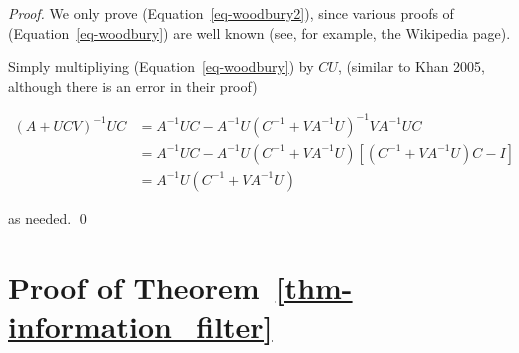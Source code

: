 \documentclass[
]{report}
\theoremstyle{plain}
\theoremstyle{plain}
\theoremstyle{remark}
\begin{document}
\begin{proof}
We only prove (Equation~\ref{eq-woodbury2}), since various proofs of
(Equation~\ref{eq-woodbury}) are well known (see, for example, the
Wikipedia page).

Simply multipliying (Equation~\ref{eq-woodbury}) by \(CU\), (similar to
Khan 2005, although there is an error in their proof)

\[\begin{split}
(A+UCV)^{-1}UC &= A^{-1}UC - A^{-1}U(C^{-1} + VA^{-1}U)^{-1}VA^{-1}UC\\
&= A^{-1}UC - A^{-1}U(C^{-1} + VA^{-1}U) [(C^{-1} +VA^{-1}U)C - I]\\
&= A^{-1}U(C^{-1}+VA^{-1}U)
\end{split}
\]

as needed. \qed
\end{proof}

\section{\texorpdfstring{Proof of
Theorem~\ref{thm-information_filter}}{Proof of Theorem~}}\label{sec-app1}
\end{document}
